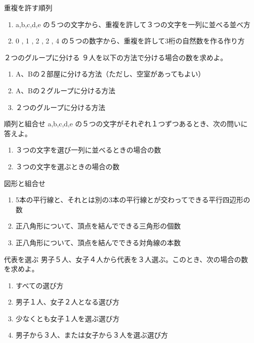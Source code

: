 \documentclass[10pt,dvipdfmx]{jsarticle}
\begin{document}
\begin{itembox}[l]{重複を許す順列}
  \begin{enumerate}
    \item a,b,c,d,e の５つの文字から、重複を許して３つの文字を一列に並べる並べ方
    \item 0 , 1 , 2 , 2 , 4 の５つの数字から、重複を許して3桁の自然数を作る作り方
  \end{enumerate}
\end{itembox}
\begin{itembox}[l]{２つのグループに分ける}
  ９人を以下の方法で分ける場合の数を求めよ。
  \begin{enumerate}
    \item A、Bの２部屋に分ける方法（ただし、空室があってもよい）
    \item A、Bの２グループに分ける方法
    \item ２つのグループに分ける方法
  \end{enumerate}
\end{itembox}
\begin{itembox}[l]{順列と組合せ}
  a,b,c,d,e の５つの文字がそれぞれ１つずつあるとき、次の問いに答えよ。
  \begin{enumerate}
    \item ３つの文字を選び一列に並べるときの場合の数
    \item ３つの文字を選ぶときの場合の数
  \end{enumerate}
\end{itembox}
\begin{itembox}[l]{図形と組合せ}

  \begin{enumerate}
    \item 5本の平行線と、それとは別の3本の平行線とが交わってできる平行四辺形の数
    \item 正八角形について、頂点を結んでできる三角形の個数
    \item 正八角形について、頂点を結んでできる対角線の本数
  \end{enumerate}
\end{itembox}
\begin{itembox}[l]{代表を選ぶ}
  男子５人、女子４人から代表を３人選ぶ。このとき、次の場合の数を求めよ。
  \begin{enumerate}
    \item すべての選び方
    \item 男子１人、女子２人となる選び方
    \item 少なくとも女子１人を選ぶ選び方
    \item 男子から３人、または女子から３人を選ぶ選び方
  \end{enumerate}
\end{itembox}
\end{document}
